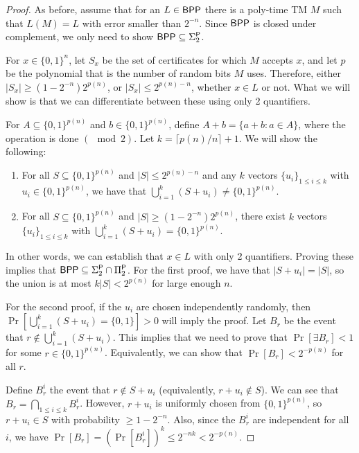 \begin{proof}
As before, assume that for an $L \in {\ensuremath{\mathsf{BPP}}}$ there is a poly-time TM $M$ such that $L(M) = L$ with error smaller than $2^{-n}$. Since ${\mathsf{BPP}}$ is closed under complement, we only need to show ${\mathsf{BPP}} \subseteq \Sigma_2^{\mathsf{P}}$.

\par For $x \in \{0, 1\}^n$, let $S_x$ be the set of certificates for which $M$ accepts $x$, and let $p$ be the polynomial that is the number of random bits $M$ uses. Therefore, either $|S_x| \ge (1-2^{-n})2^{p(n)}$, or $|S_x| \le 2^{p(n)-n}$, whether $x \in L$ or not. What we will show is that we can differentiate between these using only 2 quantifiers.

\par For $A \subseteq \{0, 1\}^{p(n)}$ and $b \in \{0, 1\}^{p(n)}$, define $A+b = \{a+b \colon a \in A\}$, where the operation is done $(\mod 2)$. Let $k = \lceil {p(n)/n} \rceil +1$. We will show the following:

\begin{enumerate}
\item For all $S \subseteq \{0, 1\}^{p(n)}$ and $|S| \le 2^{p(n)-n}$ and any $k$ vectors $\{u_i\}_{1 \le i \le k}$ with $u_i \in \{0, 1\}^{p(n)}$, we have that $\bigcup_{i=1}^{k} (S+u_i) \ne \{0, 1\}^{p(n)}$.

\item For all $S \subseteq \{0, 1\}^{p(n)}$ and $|S| \ge (1-2^{-n})2^{p(n)}$, there exist $k$ vectors $\{u_i\}_{1 \le i \le k}$ with $\bigcup_{i=1}^{k}(S+u_i) = \{0, 1\}^{p(n)}$.
\end{enumerate}
In other words, we can establish that $x \in L$ with only 2 quantifiers. Proving these implies that ${\mathsf{BPP}} \subseteq \Sigma_2^{\mathsf{P}} \cap \Pi_2^{\mathsf{P}}$. For the first proof, we have that $|S + u_i| = |S|$, so the union is at most $k|S| < 2^{p(n)}$ for large enough $n$.

\par For the second proof, if the $u_i$ are chosen independently randomly, then $\Pr[\bigcup_{i=1}^{k}(S+u_i) = \{0, 1\}] > 0$ will imply the proof. Let $B_r$ be the event that $r \notin \bigcup_{i=1}^{k}(S+u_i)$. This implies that we need to prove that $\Pr[\exists B_r] < 1$ for some $r \in \{0, 1\}^{p(n)}$. Equivalently, we can show that $\Pr[B_r] < 2^{-p(n)}$ for all $r$. 

\par Define $B_r^i$ the event that $r \notin S + u_i$ (equivalently, $r + u_i \notin S$). We can see that $B_r = \bigcap_{1 \le i \le k}B_{r}^i$. However, $r+u_i$ is uniformly chosen from $\{0, 1\}^{p(n)}$, so $r+u_i \in S$ with probability $\ge 1-2^{-n}$. Also, since the $B_r^i$ are independent for all $i$, we have $\Pr[B_r] = (\Pr[B_r^i])^k \le 2^{-nk} < 2^{-p(n)}$. 
\end{proof}


